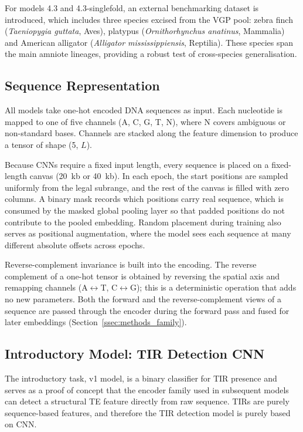 \documentclass[12pt]{article}
\begin{document}
For models 4.3 and 4.3-singlefold, an external benchmarking dataset is introduced, which includes three species excised from the VGP pool: zebra finch (\textit{Taeniopygia guttata}, Aves), platypus (\textit{Ornithorhynchus anatinus}, Mammalia) and American alligator (\textit{Alligator mississippiensis}, Reptilia). These species span the main amniote lineages, providing a robust test of cross-species generalisation. 

\subsection{Sequence Representation}\label{ssec:repr}

All models take one-hot encoded DNA sequences as input. Each nucleotide is mapped to one of five channels (A, C, G, T, N), where N covers ambiguous or non-standard bases. Channels are stacked along the feature dimension to produce a tensor of shape (5, $L$). 

Because CNNs require a fixed input length, every sequence is placed on a fixed-length canvas (20~kb or 40~kb). In each epoch, the start positions are sampled uniformly from the legal subrange, and the rest of the canvas is filled with zero columns. A binary mask records which positions carry real sequence, which is consumed by the masked global pooling layer so that padded positions do not contribute to the pooled embedding. Random placement during training also serves as positional augmentation, where the model sees each sequence at many different absolute offsets across epochs.

Reverse-complement invariance is built into the encoding. The reverse complement of a one-hot tensor is obtained by reversing the spatial axis and remapping channels (A$\leftrightarrow$T, C$\leftrightarrow$G); this is a deterministic operation that adds no new parameters. Both the forward and the reverse-complement views of a sequence are passed through the encoder during the forward pass and fused for later embeddings (Section~\ref{ssec:methods_family}).

\subsection{Introductory Model: TIR Detection CNN}\label{ssec:methods_v1}

The introductory task, v1 model, is a binary classifier for TIR presence and serves as a proof of concept that the encoder family used in subsequent models can detect a structural TE feature directly from raw sequence. TIRs are purely sequence-based features, and therefore the TIR detection model is purely based on CNN. 
\end{document}
